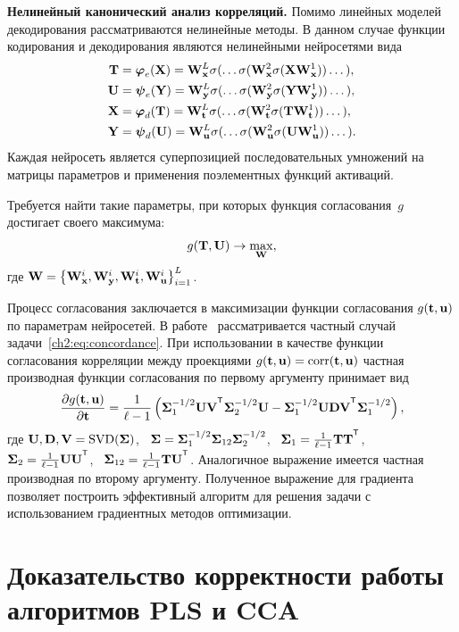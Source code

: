 \textbf{Нелинейный канонический анализ корреляций.}
Помимо линейных моделей декодирования рассматриваются нелинейные методы. 
В данном случае функции кодирования и декодирования являются нелинейными нейросетями вида
\begin{align*}
	\mathbf{T} &= \boldsymbol{\varphi}_e(\mathbf{X}) =  \mathbf{W}_{\mathbf{x}}^L \sigma(\dots \sigma(\mathbf{W}_{\mathbf{x}}^2 \sigma(\mathbf{X} \mathbf{W}_{\mathbf{x}}^1)) \dots ), \\
	\mathbf{U} &= \boldsymbol{\psi}_e(\mathbf{Y}) =  \mathbf{W}_{\mathbf{y}}^L \sigma(\dots \sigma(\mathbf{W}_{\mathbf{y}}^2 \sigma(\mathbf{Y} \mathbf{W}_{\mathbf{y}}^1)) \dots ), \\
	\mathbf{X} &= \boldsymbol{\varphi}_d(\mathbf{T}) =  \mathbf{W}_{\mathbf{t}}^L \sigma(\dots \sigma(\mathbf{W}_{\mathbf{t}}^2 \sigma(\mathbf{T} \mathbf{W}_{\mathbf{t}}^1)) \dots ), \\
	\mathbf{Y} &= \boldsymbol{\psi}_d(\mathbf{U}) =  \mathbf{W}_{\mathbf{u}}^L \sigma(\dots \sigma(\mathbf{W}_{\mathbf{u}}^2 \sigma(\mathbf{U} \mathbf{W}_{\mathbf{u}}^1)) \dots ).
\end{align*}
Каждая нейросеть является суперпозицией последовательных умножений на матрицы параметров и применения поэлементных функций активаций.

Требуется найти такие параметры, при которых функция согласования~$g$ достигает своего максимума:
\begin{equation}
	g(\mathbf{T}, \mathbf{U}) \rightarrow \max_{\mathbf{W}},
	\label{ch2:eq:concordance}
\end{equation}
где $\mathbf{W} = \bigl\{\mathbf{W}_{\mathbf{x}}^i, \mathbf{W}_{\mathbf{y}}^i, \mathbf{W}_{\mathbf{t}}^i, \mathbf{W}_{\mathbf{u}}^i\bigr\}_{i=1}^L$.

Процесс согласования заключается в максимизации функции согласования $g(\mathbf{t}, \mathbf{u})$ по параметрам нейросетей.
В работе~\cite{andrew2013deep} рассматривается частный случай задачи~\eqref{ch2:eq:concordance}. 
При использовании в качестве функции согласования корреляции между проекциями $g(\mathbf{t}, \mathbf{u}) = \textnormal{corr}(\mathbf{t}, \mathbf{u})$ частная производная функции согласования по первому аргументу принимает вид
\[
	\frac{\partial g(\bt, \bu)}{\partial \bt} = \frac{1}{\ell - 1} \left(\bSigma_1^{-1/2} \bU \bV^{\T} \bSigma_2^{-1/2} \bU - \bSigma_1^{-1/2} \bU \bD \bV^{\T} \bSigma_1^{-1/2} \right),
\]
где $\mathbf{U}, \mathbf{D}, \mathbf{V} = \textnormal{SVD}(\boldsymbol{\Sigma})$, \, $\boldsymbol{\Sigma} = \boldsymbol{\Sigma}_1^{-1/2} \boldsymbol{\Sigma}_{12} \boldsymbol{\Sigma}_2^{-1/2} $, \, $\bSigma_1 = \frac{1}{\ell - 1} \bT \bT^{\T}$, \, $\bSigma_2 = \frac{1}{\ell - 1} \bU \bU^{\T}$, \, $\bSigma_{12} = \frac{1}{\ell - 1} \bT \bU^{\T}$.
Аналогичное выражение имеется частная производная по второму аргументу.
Полученное выражение для градиента позволяет построить эффективный алгоритм для решения задачи с использованием градиентных методов оптимизации.

\section{Доказательство корректности работы алгоритмов PLS и CCA}
\label{sec:ch2:pls_proof}

